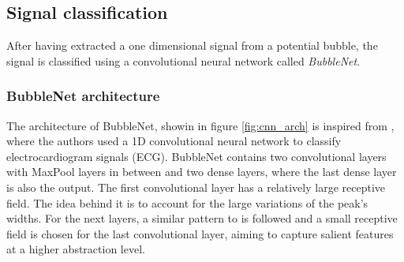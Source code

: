 		
		\subsection{Signal classification}
		After having extracted a one dimensional signal from a potential bubble, the signal is classified using a convolutional neural network called \textit{BubbleNet}. 

		\subsubsection{BubbleNet architecture}		
		The architecture of BubbleNet, showin in figure \ref{fig:cnn_arch} is inspired from \citet{Li2017}, where the authors used a 1D convolutional neural network to classify electrocardiogram signals (ECG). BubbleNet contains two convolutional layers with MaxPool layers in between and two dense layers, where the last dense layer is also the output. The first convolutional layer has a relatively large receptive field. The idea behind it is to account for the large variations of the peak's widths. For the next layers, a similar pattern to \citet{Li2017} is followed and a small receptive field is chosen for the last convolutional layer, aiming to capture salient features at a higher abstraction level. 
		
